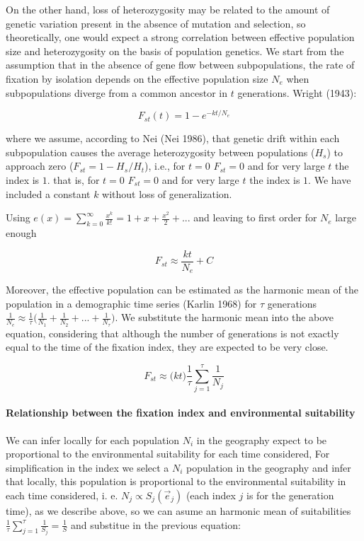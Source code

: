 \documentclass[
]{article}
\begin{document}
On the other hand, loss of heterozygosity may be related to the amount
of genetic variation present in the absence of mutation and selection,
so theoretically, one would expect a strong correlation between
effective population size and heterozygosity on the basis of population
genetics. We start from the assumption that in the absence of gene flow
between subpopulations, the rate of fixation by isolation depends on the
effective population size \(N_e\) when subpopulations diverge from a
common ancestor in \(t\) generations. Wright (1943):

\[
F_{st}(t) = 1 - e^{-kt/N_e } 
\]

where we assume, according to Nei (Nei 1986), that genetic drift within
each subpopulation causes the average heterozygosity between populations
(\(H_s\)) to approach zero (\(F_{st} = 1 - H_s/H_t\)), i.e., for \(t=0\)
\(F_{st} = 0\) and for very large \(t\) the index is \(1\). that is, for
\(t=0\) \(F_{st} = 0\) and for very large \(t\) the index is \(1\). We
have included a constant \(k\) without loss of generalization.

Using
\(e(x) = \sum_{k=0}^{\infty} \frac{x^k}{k!} = 1 + x + \frac{x^2}{2} + ...\)
and leaving to first order for \(N_e\) large enough

\[
F_{st} \approx \frac{kt}{N_e} + C
\]

Moreover, the effective population can be estimated as the harmonic mean
of the population in a demographic time series (Karlin 1968) for
\(\tau\) generations
\(\frac{1}{N_e} \approx \frac{1}{\tau}\Big({\frac{1}{N_1} + \frac{1}{N_2} + ... + \frac{1}{N_\tau} } \Big)\).
We substitute the harmonic mean into the above equation, considering
that although the number of generations is not exactly equal to the time
of the fixation index, they are expected to be very close.

\[
F_{st} \approx \Big (kt\Big)  \frac{1}{\tau}\sum_{j=1}^{\tau}\frac{1}{N_j} 
\]

\hypertarget{relationship-between-the-fixation-index-and-environmental-suitability}{%
\paragraph{Relationship between the fixation index and environmental
suitability}\label{relationship-between-the-fixation-index-and-environmental-suitability}}

We can infer locally for each population \(N_i\) in the geography expect
to be proportional to the environmental suitability for each time
considered, For simplification in the index we select a \(N_i\)
population in the geography and infer that locally, this population is
proportional to the environmental suitability in each time considered,
i. e. \(N_{j} \propto S_{j}(\vec{e}_{j})\) (each index \(j\) is for the
generation time), as we describe above, so we can asume an harmonic mean
of suitabilities
\(\frac{1}{\tau}\sum_{j = 1}^{\tau} \frac{1}{S_j} = \frac{1}{S}\) and
substitue in the previous equation:
\end{document}
